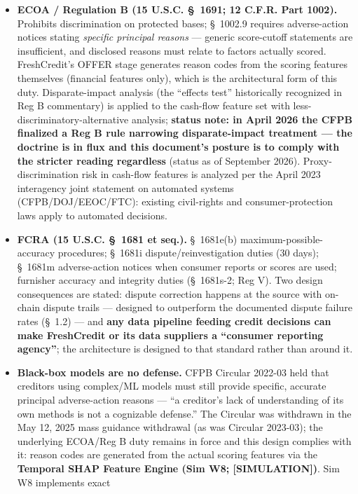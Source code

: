 \documentclass[
]{article}
\begin{document}
\begin{itemize}
\item
  \textbf{ECOA / Regulation B (15 U.S.C. §~1691; 12 C.F.R. Part 1002).}
  Prohibits discrimination on protected bases; §~1002.9 requires
  adverse-action notices stating \emph{specific principal reasons} ---
  generic score-cutoff statements are insufficient, and disclosed
  reasons must relate to factors actually scored. FreshCredit's OFFER
  stage generates reason codes from the scoring features themselves
  (financial features only), which is the architectural form of this
  duty. Disparate-impact analysis (the ``effects test'' historically
  recognized in Reg B commentary) is applied to the cash-flow feature
  set with less-discriminatory-alternative analysis; \textbf{status
  note: in April 2026 the CFPB finalized a Reg B rule narrowing
  disparate-impact treatment --- the doctrine is in flux and this
  document's posture is to comply with the stricter reading regardless}
  (status as of September 2026). Proxy-discrimination risk in cash-flow
  features is analyzed per the April 2023 interagency joint statement on
  automated systems (CFPB/DOJ/EEOC/FTC): existing civil-rights and
  consumer-protection laws apply to automated decisions.
\item
  \textbf{FCRA (15 U.S.C. §~1681 et seq.).} §~1681e(b)
  maximum-possible-accuracy procedures; §~1681i dispute/reinvestigation
  duties (30 days); §~1681m adverse-action notices when consumer reports
  or scores are used; furnisher accuracy and integrity duties
  (§~1681s-2; Reg V). Two design consequences are stated: dispute
  correction happens at the source with on-chain dispute trails ---
  designed to outperform the documented dispute failure rates (§~1.2)
  --- and \textbf{any data pipeline feeding credit decisions can make
  FreshCredit or its data suppliers a ``consumer reporting agency''};
  the architecture is designed to that standard rather than around it.
\item
  \textbf{Black-box models are no defense.} CFPB Circular 2022-03 held
  that creditors using complex/ML models must still provide specific,
  accurate principal adverse-action reasons --- ``a creditor's lack of
  understanding of its own methods is not a cognizable defense.'' The
  Circular was withdrawn in the May 12, 2025 mass guidance withdrawal
  (as was Circular 2023-03); the underlying ECOA/Reg B duty remains in
  force and this design complies with it: reason codes are generated
  from the actual scoring features via the \textbf{Temporal SHAP Feature
  Engine (Sim W8; {[}SIMULATION{]})}. Sim W8 implements exact

\end{itemize}
\end{document}
